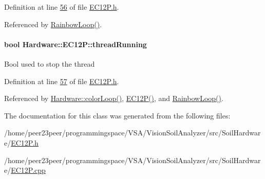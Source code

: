 Definition at line \hyperlink{_e_c12_p_8h_source_l00056}{56} of file \hyperlink{_e_c12_p_8h_source}{E\+C12\+P.\+h}.



Referenced by \hyperlink{_e_c12_p_8cpp_source_l00082}{Rainbow\+Loop()}.

\hypertarget{class_hardware_1_1_e_c12_p_a81af8167f5a5192d8575ebad04952d57}{}
\paragraph[{thread\+Running}]{\setlength{\rightskip}{0pt plus 5cm}bool Hardware\+::\+E\+C12\+P\+::thread\+Running\hspace{0.3cm}{\ttfamily [private]}}\label{class_hardware_1_1_e_c12_p_a81af8167f5a5192d8575ebad04952d57}
Bool used to stop the thread 

Definition at line \hyperlink{_e_c12_p_8h_source_l00057}{57} of file \hyperlink{_e_c12_p_8h_source}{E\+C12\+P.\+h}.



Referenced by \hyperlink{_e_c12_p_8cpp_source_l00091}{Hardware\+::color\+Loop()}, \hyperlink{_e_c12_p_8cpp_source_l00012}{E\+C12\+P()}, and \hyperlink{_e_c12_p_8cpp_source_l00082}{Rainbow\+Loop()}.



The documentation for this class was generated from the following files\+:\begin{DoxyCompactItemize}
\item 
/home/peer23peer/programmingspace/\+V\+S\+A/\+Vision\+Soil\+Analyzer/src/\+Soil\+Hardware/\hyperlink{_e_c12_p_8h}{E\+C12\+P.\+h}\item 
/home/peer23peer/programmingspace/\+V\+S\+A/\+Vision\+Soil\+Analyzer/src/\+Soil\+Hardware/\hyperlink{_e_c12_p_8cpp}{E\+C12\+P.\+cpp}\end{DoxyCompactItemize}
